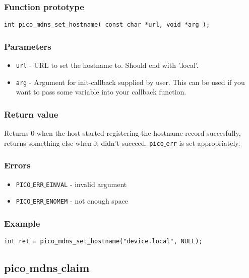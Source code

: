 \subsubsection*{Function prototype}
\begin{verbatim}
int pico_mdns_set_hostname( const char *url, void *arg );
\end{verbatim}

\subsubsection*{Parameters}
\begin{itemize}[noitemsep]
\item \texttt{url} - URL to set the hostname to. Should end with '.local'.
\item \texttt{arg} - Argument for init-callback supplied by user. This can be used if you want to pass some variable into your callback function.
\end{itemize}

\subsubsection*{Return value}
Returns 0 when the host started registering the hostname-record succesfully, returns something else when it didn't succeed. \texttt{pico$\_$err} is set appropriately.

\subsubsection*{Errors}
\begin{itemize}[noitemsep]
\item \texttt{PICO$\_$ERR$\_$EINVAL} - invalid argument
\item \texttt{PICO$\_$ERR$\_$ENOMEM} - not enough space
\end{itemize}

\subsubsection*{Example}
\begin{verbatim}
int ret = pico_mdns_set_hostname("device.local", NULL);
\end{verbatim}


\subsection{pico$\_$mdns$\_$claim}

